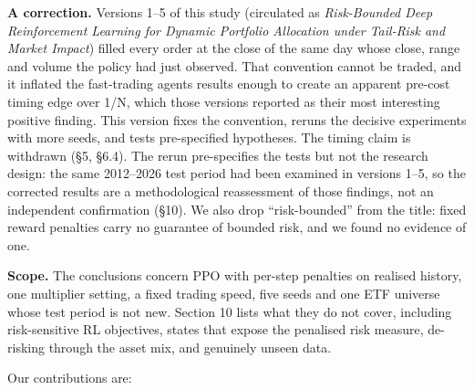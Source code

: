 \documentclass[11pt]{article}
\begin{document}
\textbf{A correction.} Versions 1--5 of this study (circulated as \emph{Risk-Bounded Deep Reinforcement Learning for Dynamic Portfolio Allocation under Tail-Risk and Market Impact}) filled every order at the close of the same day whose close, range and volume the policy had just observed. That convention cannot be traded, and it inflated the fast-trading agents\textquotesingle{} results enough to create an apparent pre-cost timing edge over 1/N, which those versions reported as their most interesting positive finding. This version fixes the convention, reruns the decisive experiments with more seeds, and tests pre-specified hypotheses. The timing claim is withdrawn (\S{}5, \S{}6.4). The rerun pre-specifies the tests but not the research design: the same 2012--2026 test period had been examined in versions 1--5, so the corrected results are a methodological reassessment of those findings, not an independent confirmation (\S{}10). We also drop ``risk-bounded'' from the title: fixed reward penalties carry no guarantee of bounded risk, and we found no evidence of one.

\textbf{Scope.} The conclusions concern PPO with per-step penalties on realised history, one multiplier setting, a fixed trading speed, five seeds and one ETF universe whose test period is not new. Section 10 lists what they do not cover, including risk-sensitive RL objectives, states that expose the penalised risk measure, de-risking through the asset mix, and genuinely unseen data.

Our contributions are:
\end{document}
